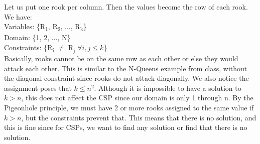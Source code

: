 \documentclass[paper=a4, fontsize=11pt]{scrartcl} %
\numberwithin{equation}{section} %
\numberwithin{figure}{section} %
\numberwithin{table}{section} %
\begin{document}
Let us put one rook per column. Then the values become the row of each rook. We have: \\
\newline
Variables: \{R\textsubscript{1}, R\textsubscript{2}, ..., R\textsubscript{k}\} \\
Domain: \{1, 2, ..., N\} \\
Constraints: \{R\textsubscript{i} \(\neq\) R\textsubscript{j} \(\forall i, j \leq k\)\} \\
\newline
Basically, rooks cannot be on the same row as each other or else they would attack each other. This is similar to the N-Queens example from class, without the diagonal constraint since rooks do not attack diagonally. We also notice the assignment poses that \(k \leq n^2\). Although it is impossible to have a solution to \(k > n\), this does not affect the CSP since our domain is only 1 through n. By the Pigeonhole principle, we must have 2 or more rooks assigned to the same value if \(k > n\), but the constraints prevent that. This means that there is no solution, and this is fine since for CSPs, we want to find any solution or find that there is no solution.
\end{document}
